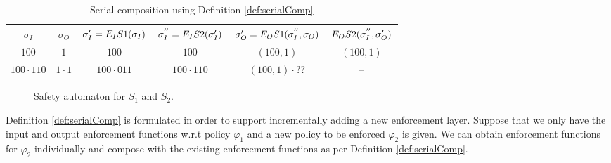 {\begin{table}
	\centering
	\begin{tabular}{|c|c|c|c|c|c|}
		\hline
		$\sigma_I$ & $\sigma_O$ & $\sigma'_I = E_{I}{S1}(\sigma_I)$ & $\sigma^{''}_I = E_{I}{S2}(\sigma'_I)$ & $ \sigma'_O = E_{O}{S1}(\sigma^{''}_I, \sigma_O)$ & $E_{O}{S2}(\sigma^{''}_I, \sigma'_O)$ \\
		\hline
		$100$ & $1$ & $100$ & $100$ &  $(100,1)$ & $(100,1)$ \\
		\hline
		$100 \cdot 110$ & $1 \cdot 1 $ & $100 \cdot 011$ & $100 \cdot 110$ &  $(100,1) \cdot ??$ & -- \\
		
		\hline
	\end{tabular}
	\caption{Serial composition using Definition \ref{def:serialComp}}
	\label{tableEgSerialDef}
\end{table}
\begin{figure}
	\centering
	\centering
	\hspace{0.1em}
	\caption{Safety automaton for $S_1$ and $S_2$.}
	\label{fig:prop1&2-duplicate}
\end{figure}
\begin{remark}
	
	Definition \ref{def:serialComp} is formulated in order to support incrementally adding a new enforcement layer. Suppose that we only have the input and output enforcement functions w.r.t policy $\varphi_1$ and a new policy to be enforced $\varphi_2$ is given. 
	We can obtain enforcement functions for $\varphi_2$ individually and compose with the existing enforcement functions as per Definition \ref{def:serialComp}.
	

\end{remark}}
